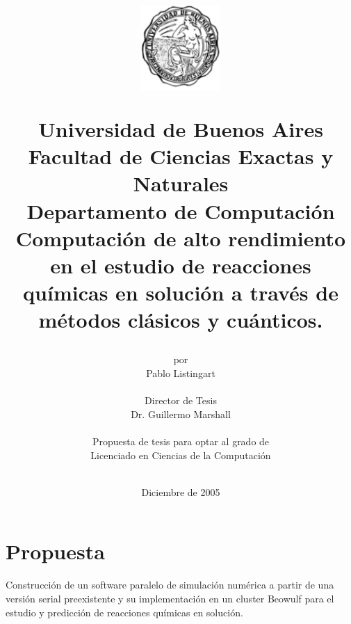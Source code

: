 \documentclass[a4paper, 12pt]{article}
\begin{document}

\title {
\begin{figure}[h]
\begin{center}
\includegraphics[keepaspectratio, width=3cm]{escudo}
\end{center}
\end{figure}
Universidad de Buenos Aires\\
Facultad de Ciencias Exactas y Naturales\\
Departamento de Computaci\'on\\
\vspace{10mm}
\Huge\textbf{Computaci\'on de alto rendimiento en el estudio de reacciones qu\'imicas en soluci\'on
a trav\'es de m\'etodos cl\'asicos y cu\'anticos.}
\vspace{10mm}
}

\author{por \\
    Pablo Listingart\\
        \\
        Director de Tesis\\
        Dr. Guillermo Marshall\\
        \\
        Propuesta de tesis para optar al grado de \\
        Licenciado en Ciencias de la Computaci\'on\\
        \\
        }
\date{Diciembre de 2005}

\maketitle

\pagebreak

\section*{Propuesta}

Construcci\'on de un software paralelo de simulaci\'on num\'erica a partir de una versi\'on serial preexistente y su implementaci\'on en un cluster Beowulf para el estudio y predicci\'on de reacciones qu\'imicas en soluci\'on.
\end{document}
